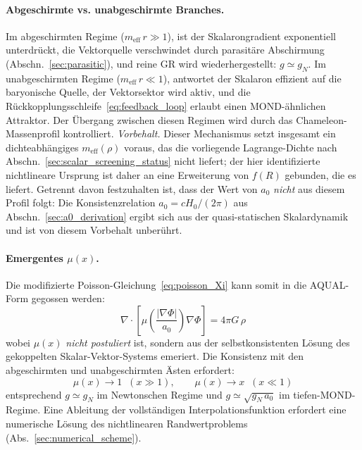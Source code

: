 \documentclass[aps,prd,twocolumn,superscriptaddress,nofootinbib]{revtex4-2}
\begin{document}
\paragraph{Abgeschirmte vs. unabgeschirmte Branches.}
Im abgeschirmten Regime ($m_{\mathrm{eff}}\,r \gg 1$), ist der Skalarongradient exponentiell unterdr\"uckt, die Vektorquelle verschwindet durch parasit\"are Abschirmung (Abschn.~\ref{sec:parasitic}), und reine GR wird wiederhergestellt: $g \simeq g_N$. Im unabgeschirmten Regime ($m_{\mathrm{eff}}\,r \ll 1$), antwortet der Skalaron effizient auf die baryonische Quelle, der Vektorsektor wird aktiv, und die R\"uckkopplungsschleife~\eqref{eq:feedback_loop} erlaubt einen MOND-\"ahnlichen Attraktor. Der \"Ubergang zwischen diesen Regimen wird durch das Chameleon-Massenprofil kontrolliert. \textit{Vorbehalt.} Dieser Mechanismus setzt insgesamt ein dichteabh\"angiges $m_{\mathrm{eff}}(\rho)$ voraus, das die vorliegende Lagrange-Dichte nach Abschn.~\ref{sec:scalar_screening_status} nicht liefert; der hier identifizierte nichtlineare Ursprung ist daher an eine Erweiterung von $f(R)$ gebunden, die es liefert. Getrennt davon festzuhalten ist, dass der Wert von $a_0$ \textit{nicht} aus diesem Profil folgt: Die Konsistenzrelation $a_0 = cH_0/(2\pi)$ aus Abschn.~\ref{sec:a0_derivation} ergibt sich aus der quasi-statischen Skalardynamik und ist von diesem Vorbehalt unber\"uhrt.

\paragraph{Emergentes $\mu(x)$.}
Die modifizierte Poisson-Gleichung~\eqref{eq:poisson_Xi} kann somit in die AQUAL-Form gegossen werden:
\begin{equation}
\nabla\!\cdot\!\left[\mu\!\left(\frac{|\nabla\Phi|}{a_0}\right)\nabla\Phi\right] = 4\pi G\,\rho
\label{eq:aqual_emergent}
\end{equation}
wobei $\mu(x)$ \textit{nicht postuliert} ist, sondern aus der selbstkonsistenten L\"osung des gekoppelten Skalar-Vektor-Systems emeriert. Die Konsistenz mit den abgeschirmten und unabgeschirmten \"Asten erfordert:
\begin{equation}
\mu(x) \to 1 \;\;(x \gg 1), \qquad \mu(x) \to x \;\;(x \ll 1)
\label{eq:mu_limits}
\end{equation}
entsprechend $g \simeq g_N$ im Newtonschen Regime und $g \simeq \sqrt{g_N\,a_0}$ im tiefen-MOND-Regime. Eine Ableitung der vollst\"andigen Interpolationsfunktion erfordert eine numerische L\"osung des nichtlinearen Randwertproblems (Abs.~\ref{sec:numerical_scheme}).
\end{document}
